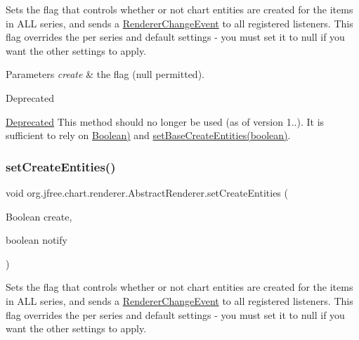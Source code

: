 Sets the flag that controls whether or not chart entities are created for the items in A\+LL series, and sends a \mbox{\hyperlink{}{Renderer\+Change\+Event}} to all registered listeners. This flag overrides the per series and default settings -\/ you must set it to {\ttfamily null} if you want the other settings to apply.


\begin{DoxyParams}{Parameters}
{\em create} & the flag ({\ttfamily null} permitted).\\
\hline
\end{DoxyParams}
\begin{DoxyRefDesc}{Deprecated}
\item[\mbox{\hyperlink{deprecated__deprecated000144}{Deprecated}}]This method should no longer be used (as of version 1..). It is sufficient to rely on \mbox{\hyperlink{}{Boolean)}} and \mbox{\hyperlink{classorg_1_1jfree_1_1chart_1_1renderer_1_1_abstract_renderer_a7f6e0858465a3692ee7e9fd580ca0c3a}{set\+Base\+Create\+Entities(boolean)}}. \end{DoxyRefDesc}
\mbox{\label{classorg_1_1jfree_1_1chart_1_1renderer_1_1_abstract_renderer_a9f772fc8aff6aae594354ad4232982e7}} 
\subsubsection{\texorpdfstring{set\+Create\+Entities()}{setCreateEntities()}\hspace{0.1cm}{\footnotesize\ttfamily [2/2]}}
{\footnotesize\ttfamily void org.\+jfree.\+chart.\+renderer.\+Abstract\+Renderer.\+set\+Create\+Entities (\begin{DoxyParamCaption}\item[{Boolean}]{create,  }\item[{boolean}]{notify }\end{DoxyParamCaption})}

Sets the flag that controls whether or not chart entities are created for the items in A\+LL series, and sends a \mbox{\hyperlink{}{Renderer\+Change\+Event}} to all registered listeners. This flag overrides the per series and default settings -\/ you must set it to {\ttfamily null} if you want the other settings to apply.


